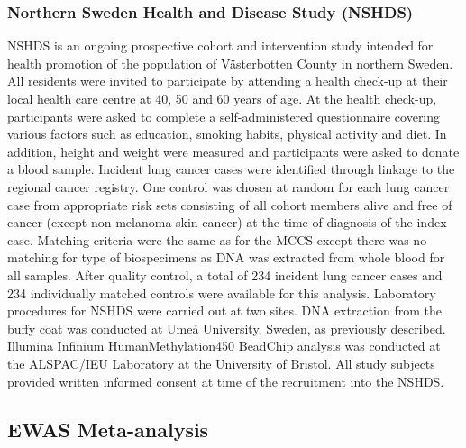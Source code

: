 \documentclass[11pt,oneside]{bristolthesis}
\begin{document}
\hypertarget{northern-sweden-health-and-disease-study-nshds}{%
\subsubsection{Northern Sweden Health and Disease Study (NSHDS)}\label{northern-sweden-health-and-disease-study-nshds}}

NSHDS is an ongoing prospective cohort and intervention study intended for health promotion of the population of Västerbotten County in northern Sweden. All residents were invited to participate by attending a health check-up at their local health care centre at 40, 50 and 60 years of age. At the health check-up, participants were asked to complete a self-administered questionnaire covering various factors such as education, smoking habits, physical activity and diet. In addition, height and weight were measured and participants were asked to donate a blood sample. Incident lung cancer cases were identified through linkage to the regional cancer registry. One control was chosen at random for each lung cancer case from appropriate risk sets consisting of all cohort members alive and free of cancer (except non-melanoma skin cancer) at the time of diagnosis of the index case. Matching criteria were the same as for the MCCS except there was no matching for type of biospecimens as DNA was extracted from whole blood for all samples. After quality control, a total of 234 incident lung cancer cases and 234 individually matched controls were available for this analysis. Laboratory procedures for NSHDS were carried out at two sites. DNA extraction from the buffy coat was conducted at Umeå University, Sweden, as previously described. Illumina Infinium HumanMethylation450 BeadChip analysis was conducted at the ALSPAC/IEU Laboratory at the University of Bristol. All study subjects provided written informed consent at time of the recruitment into the NSHDS.

\hypertarget{methods-ewas-meta-analysis}{%
\subsection{EWAS Meta-analysis}\label{methods-ewas-meta-analysis}}
\end{document}
